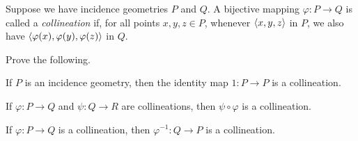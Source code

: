 \begin{dfn}[Collineation]
Suppose we have incidence geometries \(P\) and \(Q\).
A bijective mapping \(\varphi : P \rightarrow Q\) is called a \emph{collineation} if, for all points \(x,y,z \in P\), whenever \(\langle x, y, z \rangle\) in \(P\), we also have \(\langle \varphi(x), \varphi(y), \varphi(z) \rangle\) in \(Q\).
\end{dfn}

\begin{exercise}
Prove the following.
\begin{proplist}
\item If \(P\) is an incidence geometry, then the identity map \(1 : P \rightarrow P\) is a collineation.
\item If \(\varphi : P \rightarrow Q\) and \(\psi : Q \rightarrow R\) are collineations, then \(\psi \circ \varphi\) is a collineation.
\item If \(\varphi : P \rightarrow Q\) is a collineation, then \(\varphi^{-1} : Q \rightarrow P\) is a collineation.
\end{proplist}
\end{exercise}
